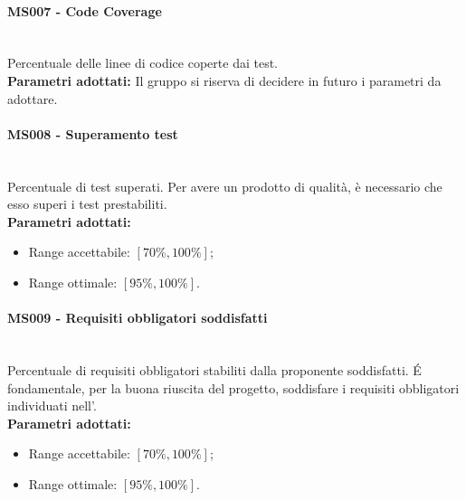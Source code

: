 \paragraph{MS007 - Code Coverage}\mbox{}\\[0,3cm]
Percentuale delle linee di codice coperte dai test.\\[0,2cm]
\textbf{Parametri adottati:\newline}
Il gruppo \gruppo \space si riserva di decidere in futuro i parametri da adottare.

\paragraph{MS008 - Superamento test}\mbox{}\\[0,3cm]
Percentuale di test superati. Per avere un prodotto di qualità, è necessario che esso superi i test prestabiliti.\\[0,2cm]
\textbf{Parametri adottati:}
\begin{itemize}
	\item Range accettabile: $[70\%,100\%]$;
	\item Range ottimale: $[95\%,100\%]$.
\end{itemize}

\paragraph{MS009 - Requisiti obbligatori soddisfatti}\mbox{}\\[0,3cm]
Percentuale di requisiti obbligatori stabiliti dalla proponente soddisfatti. \'E fondamentale, per la buona riuscita del progetto, soddisfare i requisiti obbligatori individuati nell'\AdR .\\[0,2cm]
\textbf{Parametri adottati:}
\begin{itemize}
	\item Range accettabile: $[70\%,100\%]$;
	\item Range ottimale: $[95\%,100\%]$.
\end{itemize}
	
